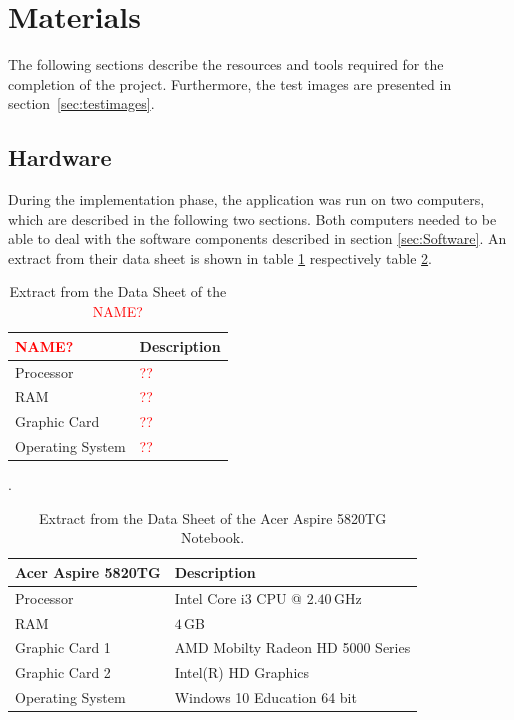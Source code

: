 \section{Materials}\label{sec:Materials}
The following sections describe the resources and tools required for the completion of the project. Furthermore, the test images are presented in section~\ref{sec:testimages}.


\subsection{Hardware}\label{sec:Hardware}
During the implementation phase, the application was run on two computers, which are described in the following two sections. Both computers needed to be able to deal with the software components described in section \ref{sec:Software}. An extract from their data sheet is shown in table \ref{tab:Computer1} respectively table \ref{tab:Computer2}.


\begin{table}
	\centering
	\begin{tabular}{|l|l|}
		\hline
		\Absatzbox{}
		\textbf{\textcolor{red}{NAME?}}& \textbf{Description} \\
		\hline
		Processor & \textcolor{red}{??} \\
		\hline
		RAM & \textcolor{red}{??}  \\
 		\hline 
		Graphic Card & \textcolor{red}{??} \\
		\hline
		Operating System & \textcolor{red}{??}  \\
		\hline
	\end{tabular}
	\caption[Extract from the Data Sheet of the \textcolor{red}{NAME?}]{Extract from the Data Sheet of the \textcolor{red}{NAME?}}.
	\label{tab:Computer1}
\end{table}

\begin{table}
	\centering
	\begin{tabular}{|l|l|}
		\hline
		\Absatzbox{}
		\textbf{Acer Aspire 5820TG}& \textbf{Description} \\
		\hline
		Processor & Intel Core i3 CPU @ $2.40\,$GHz \\
		\hline
		RAM & $4\,$GB \\
 		\hline 
		Graphic Card 1 & AMD Mobilty Radeon HD 5000 Series\\
		\hline
		Graphic Card 2 & Intel(R) HD Graphics\\
		\hline
		Operating System & Windows 10 Education 64 bit \\
		\hline
	\end{tabular}
	\caption[Extract from the Data Sheet of the Acer Aspire 5820TG Notebook.]{Extract from the Data Sheet of the Acer Aspire 5820TG Notebook.}
	\label{tab:Computer2}
\end{table}


